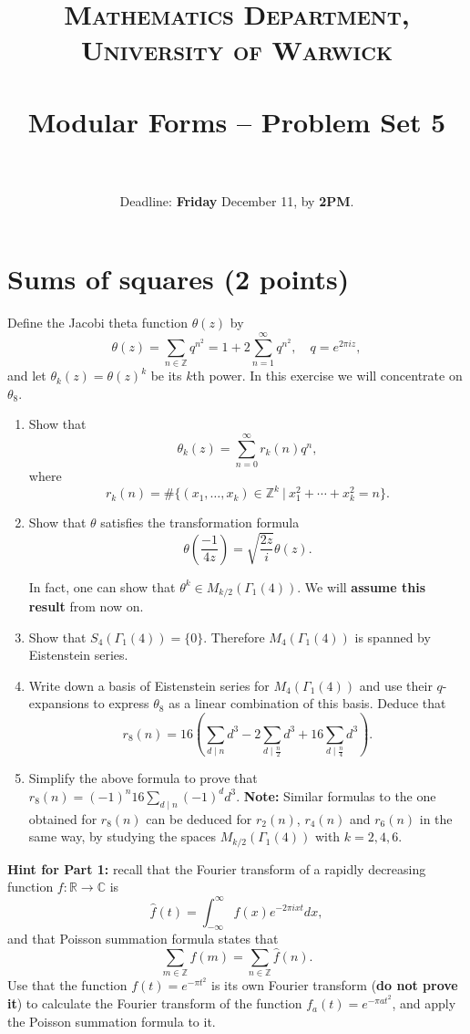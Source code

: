 \documentclass[paper=a4, fontsize=11pt]{scrartcl} %
\title{	
\normalfont \normalsize 
\textsc{Mathematics Department, University of Warwick} \\ [20pt] %
\horrule{0.5pt} \\[0.4cm] %
\huge Modular Forms -- Problem Set 5 \\ %
\horrule{2pt} \\ %
}
\date{Deadline: \textbf{Friday} December 11, by \textbf{2PM}.}
\numberwithin{equation}{section} %
\numberwithin{figure}{section} %
\numberwithin{table}{section} %
\newcommand{\bbC}{\mathbb{C}}
\newcommand{\bbZ}{\mathbb{Z}}
\newcommand{\bbR}{\mathbb{R}}
\newcommand{\RR}{\bbR}
\newcommand{\CC}{\bbC}
\newcommand{\ZZ}{\bbZ}
\begin{document}
\maketitle %

\section{Sums of squares (2 points)}

Define the Jacobi theta function $\theta(z)$ by
\[
\theta(z)=\sum_{n\in\ZZ}q^{n^2}=1+2\sum_{n=1}^\infty q^{n^2},\quad q=e^{2\pi i z},
\]
and let $\theta_k(z)=\theta(z)^k$ be its $k$th power. In this exercise we will concentrate on $\theta_8$.
\begin{enumerate}
\item Show that
\[
\theta_k(z)=\sum_{n=0}^\infty r_k(n)q^n,
\]
where
\[
r_k(n) = \# \{(x_1,\ldots,x_k)\in \ZZ^k~|~ x_1^2+\cdots+x_k^2 = n\}.
\]

\item Show that $\theta$ satisfies the transformation formula
\[
\theta\left(\frac{-1}{4z}\right) = \sqrt{\frac{2z}{i}} \theta(z).
\]

In fact, one can show that $\theta^k\in M_{k/2}(\Gamma_1(4))$. We will \textbf{assume this result} from now on.
\item Show that $S_4(\Gamma_1(4))=\{0\}$. Therefore $M_4(\Gamma_1(4))$ is spanned by Eistenstein series.
\item Write down a basis of Eistenstein series for $M_4(\Gamma_1(4))$ and use their $q$-expansions to express $\theta_8$ as a linear combination of this basis. Deduce that
\[
r_8(n)=16\left(\sum_{d\mid n} d^3-2\sum_{d\mid\frac{n}{2}} d^3 + 16\sum_{d\mid \frac{n}{4}} d^3\right).
\]
\item Simplify the above formula to prove that $r_8(n)=(-1)^n16\sum_{d\mid n} (-1)^d d^3$. \textbf{Note: } Similar formulas to the one obtained for $r_8(n)$ can be deduced  for $r_2(n)$, $r_4(n)$ and $r_6(n)$ in the same way, by studying the spaces $M_{k/2}(\Gamma_1(4))$ with $k=2,4,6$.

\end{enumerate}
\textbf{Hint for Part 1:} recall that the Fourier transform of a rapidly decreasing function $f\colon\RR\to\CC$ is
\[
\hat f(t) = \int_{-\infty}^\infty f(x)e^{-2\pi i xt}dx,
\]
and that Poisson summation formula states that
\[
\sum_{m\in\ZZ} f(m)=\sum_{n\in\ZZ} \hat f(n).
\]
Use that the function $f(t) = e^{-\pi t^2}$ is its own Fourier transform (\textbf{do not prove it}) to calculate the Fourier transform of the function $f_a(t) = e^{-\pi a t^2}$, and apply the Poisson summation formula to it.
\end{document}
